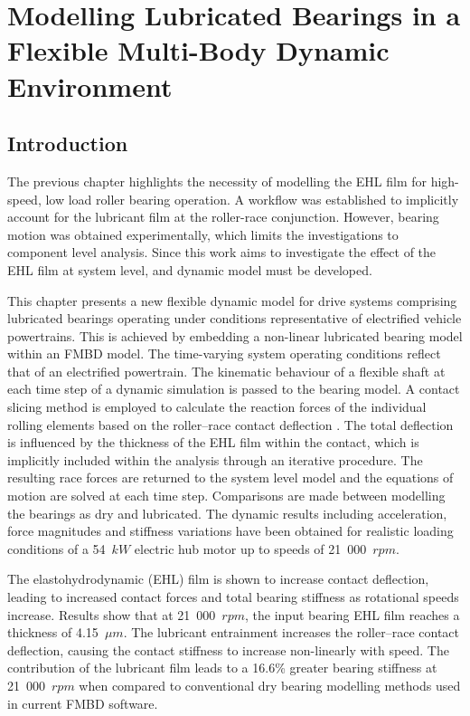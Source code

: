 \chapter{Modelling Lubricated Bearings in a Flexible Multi-Body Dynamic Environment}
\label{Lubricated FMBD}

\section{Introduction}
The previous chapter highlights the necessity of modelling the EHL film for high-speed, low load roller bearing operation. A workflow was established to implicitly account for the lubricant film at the roller-race conjunction. However, bearing motion was obtained experimentally, which limits the investigations to component level analysis. Since this work aims to investigate the effect of the EHL film at system level, and dynamic model must be developed.

This chapter presents a new flexible dynamic model for drive systems comprising lubricated bearings operating under conditions representative of electrified vehicle powertrains. This is achieved by embedding a non-linear lubricated bearing model within an FMBD model. The time-varying system operating conditions reflect that of an electrified powertrain. The kinematic behaviour of a flexible shaft at each time step of a dynamic simulation is passed to the bearing model. A contact slicing method \cite{Andreason1973} is employed to calculate the reaction forces of the individual rolling elements based on the roller–race contact deflection \cite{Lundberg1949}. The total deflection is influenced by the thickness of the EHL film within the contact, which is implicitly included within the analysis through an iterative procedure. The resulting race forces are returned to the system level model and the equations of motion are solved at each time step. Comparisons are made between modelling the bearings as dry and lubricated. The dynamic results including acceleration, force magnitudes and stiffness variations have been obtained for realistic loading conditions of a 54~$kW$ electric hub motor up to speeds of 21~000~$rpm$.

The elastohydrodynamic (EHL) film is shown to increase contact deflection, leading to increased contact forces and total bearing stiffness as rotational speeds increase. Results show that at 21~000~$rpm$, the input bearing EHL film reaches a thickness of 4.15~$\mu m$. The lubricant entrainment increases the roller–race contact deflection, causing the contact stiffness to increase non-linearly with speed. The contribution of the lubricant film leads to a 16.6\% greater bearing stiffness at 21~000~$rpm$ when compared to conventional dry bearing modelling methods used in current FMBD software.

